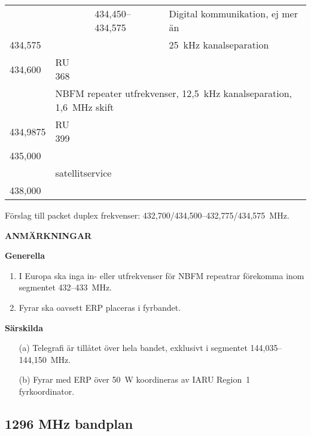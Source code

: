 \begin{longtable}{llll}
        &            & 434,450--434,575 & Digital kommunikation, ej mer än \\
434,575 &            &                   & 25~kHz kanalseparation \\
434,600 & RU 368 & & \\
        & \multicolumn{3}{l}{NBFM repeater utfrekvenser, 12,5~kHz kanalseparation, 1,6~MHz skift} \\
434,9875 & RU 399 & & \\
435,000 & & & \\
        & \multicolumn{3}{l}{satellitservice} \\
438,000 & & & \\
\end{longtable}

Förslag till packet duplex frekvenser: 432,700/434,500--432,775/434,575~MHz.

\textbf{ANMÄRKNINGAR}

\textbf{Generella}

\begin{enumerate}[label=\alph*.]
\item I Europa ska inga in- eller utfrekvenser för NBFM repeatrar
  förekomma inom segmentet 432--433~MHz.
\item Fyrar ska oavsett ERP placeras i fyrbandet.
\end{enumerate}

\textbf{Särskilda}

\begin{itemize}
\item[(a)] Telegrafi är tillåtet över hela bandet, exklusivt i segmentet
  144,035--144,150~MHz.
\item[(b)] Fyrar med ERP över 50~W koordineras av IARU Region~1 fyrkoordinator.
\end{itemize}

\subsection{1296 MHz bandplan}

